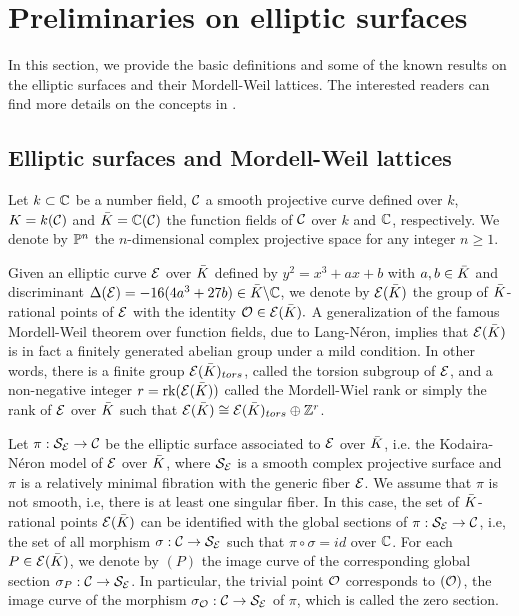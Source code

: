 \documentclass[11pt]{amsart}
\begin{document}
\section{Preliminaries  on elliptic surfaces}
In this section, we provide the basic definitions and some  of the known results on the elliptic surfaces and their Mordell-Weil lattices. 
The interested readers can find more details on the concepts in
\cite{Shioda1990a, Schuett2019, Silverman1994}.
\subsection{Elliptic surfaces and Mordell-Weil lattices}

Let $k \subset {\mathbb C}$ be a number  field,  ${\mathcal C}$ a smooth projective curve
defined over $k$,  $K=k({\mathcal C})$  and ${{\bar K}}={\mathbb C}({\mathcal C})$ the function fields of ${\mathcal C}$ over $k$ and ${\mathbb C}$, respectively.
We denote by ${\mathbb P}^n$ the $n$-dimensional complex projective space for any integer $n\geq 1$.

Given an elliptic curve ${\mathcal E}$ over ${{\bar K}}$ defined by $ y^2=x^3+ a x + b$ with  $a, b\in {{\bar K}}$ and 
discriminant  $\Delta({\mathcal E}) = - 16 (4 a^3+ 27 b) \in {{\bar K}} \backslash {\mathbb C}$,  we denote by ${\mathcal E}({{\bar K}})$ the group of ${{\bar K}}$-rational points of ${\mathcal E}$
with the identity ${\mathcal O} \in {\mathcal E}({{\bar K}}).$
A generalization of the famous Mordell-Weil theorem over function fields, due to Lang-N\'{e}ron, implies
that ${\mathcal E}({{\bar K}})$  is in fact a finitely generated abelian group under a mild condition. 
In other words, there is a finite group ${\mathcal E}({{\bar K}})_{tors}$, called the torsion subgroup of ${\mathcal E}$, and a non-negative integer
$r={\text{rk}} ({\mathcal E}({{\bar K}}))$ called the {\sf Mordell-Wiel rank} or simply the {\sf rank} of ${\mathcal E}$ over ${{\bar K}}$ such that ${\mathcal E}({{\bar K}}) \cong {\mathcal E}({{\bar K}})_{tors} \oplus {\mathbb Z}^r$.


Let  $\pi: {\mathcal S}_{\mathcal E} \rightarrow {\mathcal C}$  be the {\sf elliptic surface associated to} ${\mathcal E}$ over ${{\bar K}}$, i.e. the Kodaira-N\'{e}ron model of 
${\mathcal E}$ over ${{\bar K}}$, where  ${\mathcal S}_{\mathcal E}$ is a smooth complex projective surface
and $\pi$ is a relatively minimal fibration with the generic fiber ${\mathcal E}$.
We assume that  $\pi$ is not smooth, i.e, there is at least one singular fiber.
In this case, the set of  ${{\bar K}}$-rational points  ${\mathcal E}({{\bar K}}) $ can be identified with 
the  global sections of  $\pi: {\mathcal S}_{\mathcal E} \rightarrow {\mathcal C}$, i.e, the set of all morphism $\sigma: {\mathcal C} \rightarrow {\mathcal S}_{\mathcal E}$  
such that    $\pi \circ \sigma =id$ over ${\mathbb C}$.
For each $P\in {\mathcal E}({{\bar K}})$, we denote by $(P)$ the image curve of the corresponding global section
$\sigma_P: {\mathcal C} \rightarrow {\mathcal S}_{\mathcal E}$. In particular, the trivial point ${\mathcal O}$ corresponds to $({\mathcal O})$,  the
image curve of the morphism  $\sigma_{\mathcal O}: {\mathcal C} \rightarrow {\mathcal S}_{\mathcal E}$ of  $\pi$, which is called  the   {\sf zero section}.
\end{document}
